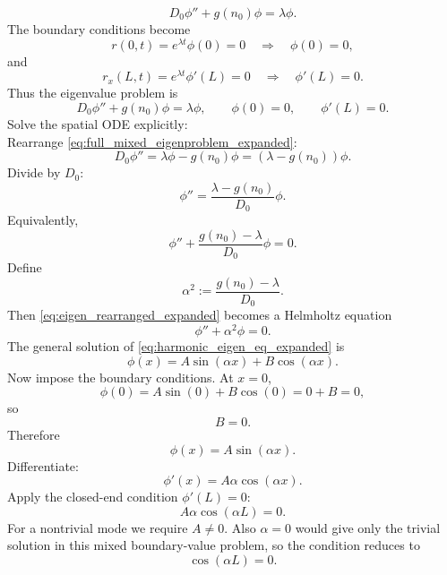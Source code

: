 \documentclass[11pt,a4paper]{report}
\begin{document}
	\begin{equation}
		D_0\phi''+g(n_0)\phi=\lambda\phi.
		\label{eq:linear_eigenproblem_expanded}
	\end{equation}
	The boundary conditions become
	\[
	r(0,t)=e^{\lambda t}\phi(0)=0
	\quad\Longrightarrow\quad
	\phi(0)=0,
	\]
	and
	\[
	r_x(L,t)=e^{\lambda t}\phi'(L)=0
	\quad\Longrightarrow\quad
	\phi'(L)=0.
	\]
	Thus the eigenvalue problem is
	\begin{equation}
		D_0\phi''+g(n_0)\phi=\lambda\phi,
		\qquad
		\phi(0)=0,
		\qquad
		\phi'(L)=0.
		\label{eq:full_mixed_eigenproblem_expanded}
	\end{equation}
	Solve the spatial ODE explicitly:\\
	Rearrange \eqref{eq:full_mixed_eigenproblem_expanded}:
	\[
	D_0\phi''
	=
	\lambda\phi-g(n_0)\phi
	=
	(\lambda-g(n_0))\phi.
	\]
	Divide by $D_0$:
	\[
	\phi''
	=
	\frac{\lambda-g(n_0)}{D_0}\phi.
	\]
	Equivalently,
	\begin{equation}
		\phi''
		+
		\frac{g(n_0)-\lambda}{D_0}\phi
		=
		0.
		\label{eq:eigen_rearranged_expanded}
	\end{equation}
	Define
	\begin{equation}
		\alpha^2:=\frac{g(n_0)-\lambda}{D_0}.
		\label{eq:alpha_def_expanded}
	\end{equation}
	Then \eqref{eq:eigen_rearranged_expanded} becomes a Helmholtz equation
	\begin{equation}
		\phi''+\alpha^2\phi=0.
		\label{eq:harmonic_eigen_eq_expanded}
	\end{equation}
	The general solution of \eqref{eq:harmonic_eigen_eq_expanded} is
	\begin{equation}
		\phi(x)=A\sin(\alpha x)+B\cos(\alpha x).
		\label{eq:general_eigenfunction_expanded}
	\end{equation}
	Now impose the boundary conditions. At $x=0$,
	\[
	\phi(0)=A\sin(0)+B\cos(0)=0+B=0,
	\]
	so
	\begin{equation}
		B=0.
	\end{equation}
	Therefore
	\begin{equation}
		\phi(x)=A\sin(\alpha x).
		\label{eq:eigenfunction_after_opening_bc_expanded}
	\end{equation}
	Differentiate:
	\[
	\phi'(x)=A\alpha\cos(\alpha x).
	\]
	Apply the closed-end condition $\phi'(L)=0$:
	\[
	A\alpha\cos(\alpha L)=0.
	\]
	For a nontrivial mode we require $A\neq 0$.  Also $\alpha=0$ would give only the trivial solution in this mixed boundary-value problem, so the condition reduces to
	\begin{equation}
		\cos(\alpha L)=0.
		\label{eq:cos_condition_expanded}
	\end{equation}
\end{document}
